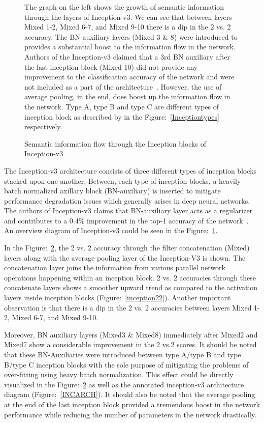\begin{figure}[!t]
\begin{subfigure}[t]{0.49\textwidth}
        \label{smalldiagram}
    \end{subfigure}
    \caption{Semantic information flow through the Inception blocks of Inception-v3\\}
    \label{V3Results}
 The graph on the left shows the growth of semantic information through the layers of Inception-v3. We can see that between layers Mixed 1-2, Mixed 6-7, and Mixed 9-10 there is a dip in the 2 vs. 2 accuracy. The BN auxiliary layers (Mixed 3 \& 8) were introduced to provides a substantial boost to the information flow in the network. Authors of the Inception-v3 claimed that a 3rd BN auxiliary after the last inception block (Mixed 10) did not provide any improvement to the classification accuracy of the network and were not included as a part of the architecture~\cite{Inception-v3}. However, the use of average pooling, in the end, does boost up the information flow in the network. Type A, type B and type C are different types of inception block as described by in the Figure:~\ref{Inceptiontypes} respectively.
\end{figure}

The Inception-v3 architecture consists of three different types of inception blocks stacked upon one another. Between, each type of inception blocks, a heavily batch normalized axillary block (BN-auxiliary) is inserted to mitigate performance degradation issues which generally arises in deep neural networks. The authors of Inception-v3 claims that BN-auxiliary layer acts as a regularizer and contributes to a 0.4\% improvement in the top-1 accuracy of the network~\cite{Inception-v3}. An overview diagram of Inception-v3 could be seen in the Figure:~\ref{smalldiagram}.




In the Figure:~\ref{V3Results}, the 2 vs. 2 accuracy through the filter concatenation (Mixed) layers along with the average pooling layer of the Inception-V3 is shown. The concatenation layer joins the information from various parallel network operations happening within an inception block. 2 vs. 2 accuracies through these concatenate layers shows a smoother upward trend as compared to the activation layers inside inception blocks (Figure:~\ref{inception22}).  Another important observation is that there is a dip in the 2 vs. 2 accuracies between layers Mixed 1-2, Mixed 6-7, and Mixed 9-10. 

Moreover, BN auxiliary layers (Mixed3 \& Mixed8) immediately after Mixed2 and Mixed7 show a considerable improvement in the 2 vs.2 scores. It should be noted that these BN-Auxiliaries were introduced between type A/type B and type B/type C inception blocks with the sole purpose of mitigating the problems of over-fitting using heavy batch normalization. This effect could be directly visualized in the Figure:~\ref{V3Results} as well as the annotated inception-v3 architecture diagram (Figure:~\ref{INCARCH}). It should also be noted that the average pooling at the end of the last inception block provided a tremendous boost in the network performance while reducing the number of parameters in the network drastically.


